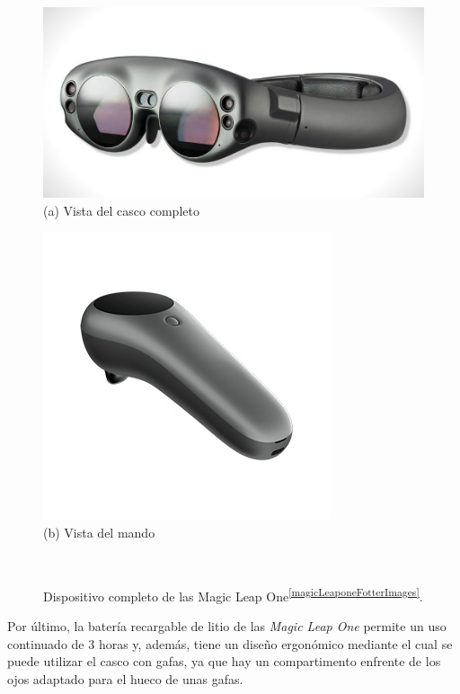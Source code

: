 \begin{figure}[htbp]
\centering
    \hspace{-4mm}
    \begin{minipage}{0.5\textwidth}
        \centering
        \includegraphics[scale=0.8]{Images/Estado del arte/magicleapone1.jpg}\\
        (a) Vista del casco completo
    \end{minipage}
    \begin{minipage}{0.5\textwidth}
        \centering
        \includegraphics[scale=0.3]{Images/Estado del arte/magicleapone2.jpg}\\
       (b) Vista del mando
    \end{minipage}\\
    \caption{Dispositivo completo de las Magic Leap One\textsuperscript{\ref{magicLeaponeFotterImages}}.}
    \label{fig:vistasMagicLeapnOne}
\end{figure}

Por último, la batería recargable de litio de las \textit{Magic Leap One} permite un uso continuado de 3 horas y, además, tiene un diseño ergonómico mediante el cual se puede utilizar el casco con gafas, ya que hay un compartimento enfrente de los ojos adaptado para el hueco de unas gafas.




